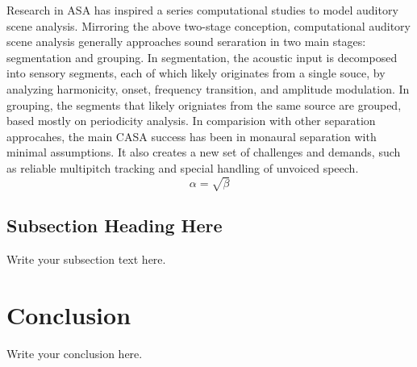 \documentclass{article}
\begin{document}
Research in ASA has inspired a series computational studies to model auditory scene analysis. Mirroring the above two-stage conception, computational auditory scene analysis generally approaches sound seraration in two main stages: segmentation and grouping. In segmentation, the acoustic input is decomposed into sensory segments, each of which likely originates from a single souce, by analyzing harmonicity, onset, frequency transition, and amplitude modulation. In grouping, the segments that likely origniates from the same source are grouped, based mostly on periodicity analysis. In comparision with other separation approcahes, the main CASA success has been in monaural separation with minimal assumptions.  It also creates a new set of challenges and demands, such as reliable multipitch tracking and special handling of unvoiced speech.
\begin{equation}
    \label{simple_equation}
    \alpha = \sqrt{ \beta }
\end{equation}

\subsection{Subsection Heading Here}
Write your subsection text here.



\section{Conclusion}
Write your conclusion here.
\end{document}
